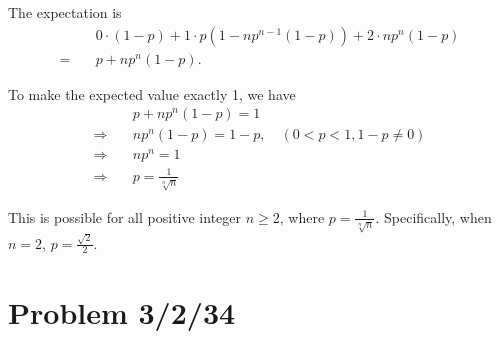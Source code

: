 \documentclass[11pt, oneside]{article}   	%
\begin{document}
 The expectation is
 \begin{align*}
& 0\cdot(1-p) +1\cdot p\left(1-n p^{n-1}(1-p)\right) +2\cdot n p^n (1-p)\\
= \quad & p + np^n (1-p).
 \end{align*}
 
 To make the expected value exactly 1, we have
 \begin{align*}
 &p + np^n (1-p)=1\\
 \Rightarrow \quad &np^n(1-p)=1-p, \quad (0<p<1, 1-p \ne 0)\\
 \Rightarrow \quad &np^n=1\\
 \Rightarrow \quad &p=\frac{1}{\sqrt[n]{n}}
 \end{align*}
 
 This is possible for all positive integer $n\ge 2$, where $p=\frac{1}{\sqrt[n]{n}}$. Specifically, when $n=2$, $p=\frac{\sqrt{2}}{2}$.
 
 
 
 \newpage
 \section{Problem 3/2/34}
 
\end{document}
